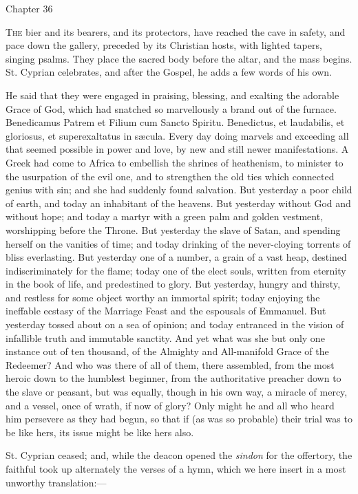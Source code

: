 Chapter 36


T\textsc{he} bier and its bearers, and its protectors, have reached
the cave in safety, and pace down the gallery, preceded by its
Christian hosts, with lighted tapers, singing psalms. They place the
sacred body before the altar, and the mass begins. St. Cyprian
celebrates, and after the Gospel, he adds a few words of his own.

He said that they were engaged in praising, blessing, and exalting
the adorable Grace of God, which had snatched so marvellously a brand
out of the furnace. Benedicamus Patrem et Filium cum Sancto Spiritu.
Benedictus, et laudabilis, et gloriosus, et superexaltatus in sæcula.
Every day doing marvels and exceeding all that seemed possible in
power and love, by new and still newer manifestations. A Greek had
come to Africa to embellish the shrines of heathenism, to minister to
the usurpation of the evil one, and to strengthen the old ties which
connected genius with sin; and she had suddenly found salvation. But
yesterday a poor child of earth, and today an inhabitant of the
heavens. But yesterday without God and without hope; and today a
martyr with a green palm and golden vestment, worshipping before
the Throne. But yesterday the slave of Satan, and spending herself on
the vanities of time; and today drinking of the never-cloying torrents
of bliss everlasting. But yesterday one of a number, a grain of a vast
heap, destined indiscriminately for the flame; today one of the elect
souls, written from eternity in the book of life, and predestined to
glory. But yesterday, hungry and thirsty, and restless for some object
worthy an immortal spirit; today enjoying the ineffable ecstasy of the
Marriage Feast and the espousals of Emmanuel. But yesterday tossed
about on a sea of opinion; and today entranced in the vision of
infallible truth and immutable sanctity. And yet what was she but only
one instance out of ten thousand, of the Almighty and All-manifold
Grace of the Redeemer? And who was there of all of them, there
assembled, from the most heroic down to the humblest beginner, from
the authoritative preacher down to the slave or peasant, but was
equally, though in his own way, a miracle of mercy, and a vessel, once
of wrath, if now of glory? Only might he and all who heard him
persevere as they had begun, so that if (as was so probable) their
trial was to be like hers, its issue might be like hers also.

St. Cyprian ceased; and, while the deacon opened the \emph{sindon}
for the offertory, the faithful took up alternately the verses of a
hymn, which we here insert in a most unworthy translation:—

